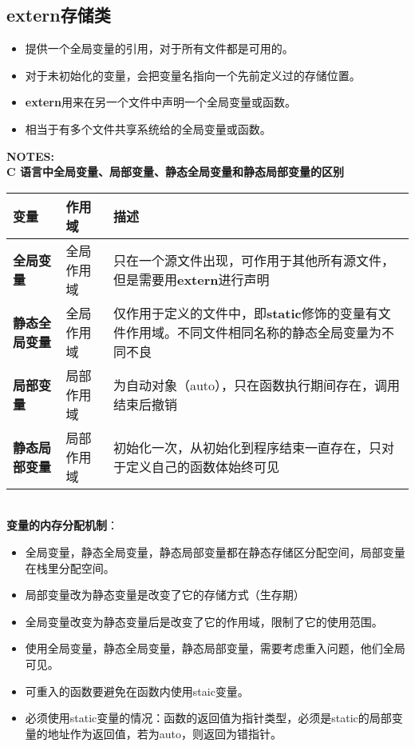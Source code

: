 \documentclass[UTF8]{ctexart}
\begin{document}
	\subsection[]{extern存储类}
	\begin{itemize}
		\item 提供一个全局变量的引用，对于所有文件都是可用的。
		\item 对于未初始化的变量，会把变量名指向一个先前定义过的存储位置。
		\item \textbf{extern}用来在另一个文件中声明一个全局变量或函数。
		\item 相当于有多个文件共享系统给的全局变量或函数。
	\end{itemize}
	\begin{framed}\textbf{NOTES:}\\
			\textbf{C 语言中全局变量、局部变量、静态全局变量和静态局部变量的区别}
		\begin{tabular*}{\linewidth}{l|l|p{14em}}
			\toprule
			变量&作用域&描述\\
			\midrule
			\textbf{全局变量}&全局作用域&只在一个源文件出现，可作用于其他所有源文件，但是需要用\textbf{extern}进行声明\\
			\midrule
			\textbf{静态全局变量}&全局作用域&仅作用于定义的文件中，即\textbf{static}修饰的变量有文件作用域。不同文件相同名称的静态全局变量为不同不良\\
			\midrule
			\textbf{局部变量}&局部作用域&为自动对象（auto），只在函数执行期间存在，调用结束后撤销\\
			\midrule
			\textbf{静态局部变量}&局部作用域&初始化一次，从初始化到程序结束一直存在，只对于定义自己的函数体始终可见\\
			\bottomrule
		\end{tabular*}\\
		\textbf{变量的内存分配机制}：
		\begin{itemize}
			\item 全局变量，静态全局变量，静态局部变量都在静态存储区分配空间，局部变量在栈里分配空间。
			\item 局部变量改为静态变量是改变了它的存储方式（生存期）
			\item 全局变量改变为静态变量后是改变了它的作用域，限制了它的使用范围。
			\item 使用全局变量，静态全局变量，静态局部变量，需要考虑重入问题，他们全局可见。
			\item 可重入的函数要避免在函数内使用staic变量。
			\item 必须使用static变量的情况：函数的返回值为指针类型，必须是static的局部变量的地址作为返回值，若为auto，则返回为错指针。

\end{itemize}
\end{framed}
\end{document}
